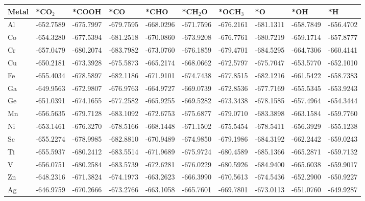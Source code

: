\begin{table}[h]
    \centering
    {\fontsize{6}{12}\selectfont %
    \begin{tabular}{*{10}{l}}
      \hline
      Metal & *CO$_2$ & *COOH    & *CO       & *CHO      & *CH$_2$O  & *OCH$_3$  & *O        & *OH       & *H        \\
      \hline
      Al	& -652.7589	&-675.7997	&-679.7595	&-668.0296	&-671.7596	&-676.2161	&-681.1311	&-658.7849	&-656.4702 \\
      Co	& -654.3280 &-677.5394	&-681.2518	&-670.0860  &-673.9208	&-676.7761	&-680.7219	&-659.1714	&-657.8777 \\
      Cr	& -657.0479	&-680.2074	&-683.7982	&-673.0760  &-676.1859	&-679.4701	&-684.5295	&-664.7306	&-660.4141 \\
      Cu	& -650.2181	&-673.3928	&-675.5873	&-665.2174	&-668.0662	&-672.5797	&-675.7047	&-653.5770  &-652.1010 \\
      Fe	& -655.4034	&-678.5897	&-682.1186	&-671.9101	&-674.7438	&-677.8515	&-682.1216	&-661.5422	&-658.7383 \\
      Ga	& -649.9563	&-672.9807	&-676.9763	&-664.9727	&-669.0739	&-672.8536	&-677.7169	&-655.5345	&-653.9243 \\
      Ge	& -651.0391	&-674.1655	&-677.2582	&-665.9255	&-669.5282	&-673.3438	&-678.1585	&-657.4964	&-654.3444 \\
      Mn	& -656.5635	&-679.7128	&-683.1092	&-672.6753	&-675.6877	&-679.0710  &-683.3898	&-663.1584	&-659.7760 \\
      Ni	& -653.1461	&-676.3270  &-678.5166	&-668.1448	&-671.1502	&-675.5454	&-678.5411	&-656.3929	&-655.1238 \\
      Sc	& -655.2274	&-678.9985	&-682.8810  &-670.9489	&-674.9850  &-679.1986	&-684.3192	&-662.2442	&-659.0243 \\
      Ti	& -655.5937	&-680.2412	&-683.5514	&-671.9689	&-675.9724	&-680.4589	&-685.1366	&-665.2871	&-659.7132 \\
      V	  & -656.0751	&-680.2584	&-683.5739	&-672.6281	&-676.0229	&-680.5926	&-684.9400	&-665.6038	&-659.9017 \\
      Zn	& -648.2316	&-671.3824	&-674.1973	&-663.2623	&-666.3990 	&-670.5613	&-674.5436	&-652.2900  &-650.9227 \\
      Ag	& -646.9759	&-670.2666	&-673.2766	&-663.1058	&-665.7601	&-669.7801	&-673.0113	&-651.0760  &-649.9287 \\

\end{tabular}}
\end{table}
